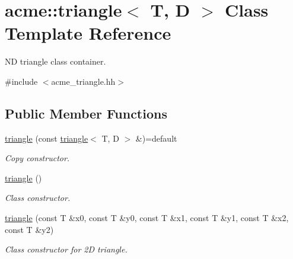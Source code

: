 \hypertarget{classacme_1_1triangle}{}\section{acme\+:\+:triangle$<$ T, D $>$ Class Template Reference}
\label{classacme_1_1triangle}


ND triangle class container.  




{\ttfamily \#include $<$acme\+\_\+triangle.\+hh$>$}

\subsection*{Public Member Functions}
\begin{DoxyCompactItemize}
\item 
\mbox{\label{classacme_1_1triangle_ab848f5a31e2f426704277802cae23e20}} 
\hyperlink{classacme_1_1triangle_ab848f5a31e2f426704277802cae23e20}{triangle} (const \hyperlink{classacme_1_1triangle}{triangle}$<$ T, D $>$ \&)=default
\begin{DoxyCompactList}\small\item\em Copy constructor. \end{DoxyCompactList}\item 
\mbox{\label{classacme_1_1triangle_ad018574df8743ddc377e911b1b2bdedc}} 
\hyperlink{classacme_1_1triangle_ad018574df8743ddc377e911b1b2bdedc}{triangle} ()
\begin{DoxyCompactList}\small\item\em Class constructor. \end{DoxyCompactList}\item 
\mbox{\label{classacme_1_1triangle_a30a79e277bbfb0550620558603e69af5}} 
\hyperlink{classacme_1_1triangle_a30a79e277bbfb0550620558603e69af5}{triangle} (const T \&x0, const T \&y0, const T \&x1, const T \&y1, const T \&x2, const T \&y2)
\begin{DoxyCompactList}\small\item\em Class constructor for 2D triangle. \end{DoxyCompactList}\item 
\mbox{\label{classacme_1_1triangle_a78a146aacb55247cc900edcb883422a5}} 

\end{DoxyCompactItemize}
